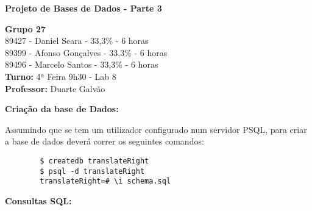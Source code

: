\documentclass[12pt]{report}
\begin{document}
    \begin{titlepage}
        \begin{center}

            \vspace*{\fill}
            \Huge
            \textbf{Projeto de Bases de Dados - Parte 3}
            
            \vspace*{\fill}

            \Large
            \textbf{Grupo 27} \\
            89427 - Daniel Seara - 33,3\% - 6 horas \\
            89399 - Afonso Gonçalves - 33,3\% - 6 horas \\
            89496 - Marcelo Santos - 33,3\% - 6 horas \\

            \bigskip
            \textbf{Turno:} 4ª Feira 9h30 - Lab 8\\ \textbf{Professor:} Duarte Galvão
        
        \end{center}
    \end{titlepage}

    \Large
    \textbf{Criação da base de Dados:}\\
    
    \normalsize
    \vspace{2mm}

    Assumindo que se tem um utilizador configurado num servidor PSQL, para criar a base de dados deverá correr os seguintes comandos:
    \begin{verbatim}
        $ createdb translateRight
        $ psql -d translateRight
        translateRight=# \i schema.sql
    \end{verbatim}
    
    \vspace*{15mm}


    \Large 
    \textbf{Consultas SQL:}

    \normalsize
    \vspace{2mm}
\end{document}
